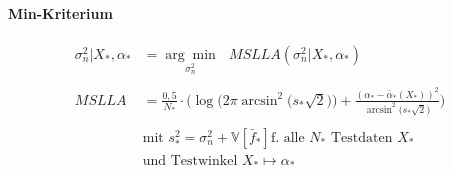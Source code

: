 \paragraph*{Min-Kriterium}


\begin{align}\label{eq:bayesopt}
	\sigma_n^2|X_*,\alpha_* &= \underset{\sigma_n^2}{\arg\min} \text{ } MSLLA(\sigma_n^2|X_*,\alpha_*) \nonumber \\
	\\
	MSLLA &= \frac{0,5}{N_*} \cdot \bigg( \log \big( 2\pi \arcsin^2 \big( s_* \sqrt{2} \big) \big) + \frac{(\alpha_* - \bar{\alpha}_*(X_*))^2}{\arcsin^2 \big( s_* \sqrt{2} \big)}\bigg) \nonumber
	\nonumber \\
	\nonumber \\
	& \text{mit } s_*^2 = \sigma_n^2 + \mathbb{V}\left[ \bar{f}_* \right] \text{f. alle } N_* \text{ Testdaten } X_* \nonumber \\
	& \text{und Testwinkel } X_* \mapsto \alpha_* \nonumber
\end{align}

